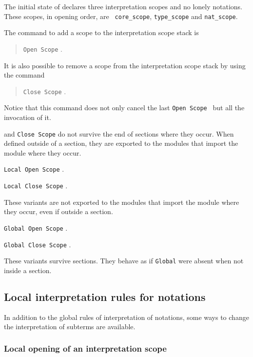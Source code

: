 The initial state of {\Coq} declares three interpretation scopes and
no lonely notations. These scopes, in opening order, are {\tt
core\_scope}, {\tt type\_scope} and {\tt nat\_scope}.

The command to add a scope to the interpretation scope stack is
\begin{quote}
{\tt Open Scope} {\scope}.
\end{quote}
It is also possible to remove a scope from the interpretation scope
stack by using the command
\begin{quote}
{\tt Close Scope} {\scope}.
\end{quote}
Notice that this command does not only cancel the last {\tt Open Scope
{\scope}} but all the invocation of it.

 and {\tt Close Scope} do not survive the end of
sections where they occur. When defined outside of a section, they are
exported to the modules that import the module where they occur.

\begin{Variants}

\item {\tt Local Open Scope} {\scope}.

\item {\tt Local Close Scope} {\scope}.

These variants are not exported to the modules that import the module
where they occur, even if outside a section.

\item {\tt Global Open Scope} {\scope}.

\item {\tt Global Close Scope} {\scope}.

These variants survive sections. They behave as if {\tt Global} were
absent when not inside a section.

\end{Variants}

\subsection{Local interpretation rules for notations}

In addition to the global rules of interpretation of notations, some
ways to change the interpretation of subterms are available.

\subsubsection{Local opening of an interpretation scope 
\label{scopechange}
\index{\%}
}


